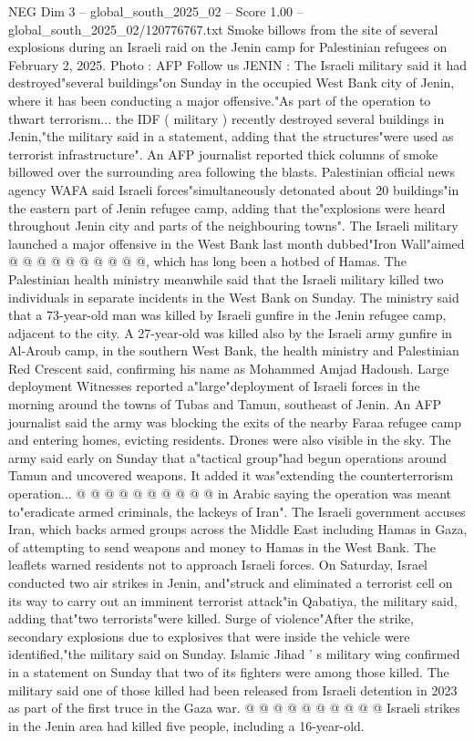 \begin{textsample}{NEG Dim 3 – global\_south\_2025\_02 – Score 1.00 – global\_south\_2025\_02/120776767.txt}  \label{ex:f3_neg_047}
Smoke billows from the site of several explosions during an Israeli raid on the Jenin camp for Palestinian refugees on February 2, 2025.
Photo : AFP Follow us JENIN : The Israeli military said it had destroyed"several buildings"on Sunday in the occupied West Bank city of Jenin, where it has been conducting a major offensive."As part of the operation to thwart terrorism... the IDF ( military ) recently destroyed several buildings in Jenin,"the military said in a statement, adding that the structures"were used as terrorist infrastructure".
An AFP journalist reported thick columns of smoke billowed over the surrounding area following the blasts.
Palestinian official news agency WAFA said Israeli forces"simultaneously detonated about 20 buildings"in the eastern part of Jenin refugee camp, adding that the"explosions were heard throughout Jenin city and parts of the neighbouring towns".
The Israeli military launched a major offensive in the West Bank last month dubbed"Iron Wall"aimed @ @ @ @ @ @ @ @ @ @, which has long been a hotbed of Hamas.
The Palestinian health ministry meanwhile said that the Israeli military killed two individuals in separate incidents in the West Bank on Sunday.
The ministry said that a 73-year-old man was killed by Israeli gunfire in the Jenin refugee camp, adjacent to the city.
A 27-year-old was killed also by the Israeli army gunfire in Al-Aroub camp, in the southern West Bank, the health ministry and Palestinian Red Crescent said, confirming his name as Mohammed Amjad Hadoush.
Large deployment Witnesses reported a"large"deployment of Israeli forces in the morning around the towns of Tubas and Tamun, southeast of Jenin.
An AFP journalist said the army was blocking the exits of the nearby Faraa refugee camp and entering homes, evicting residents.
Drones were also visible in the sky.
The army said early on Sunday that a"tactical group"had begun operations around Tamun and uncovered weapons.
It added it was"extending the counterterrorism operation... @ @ @ @ @ @ @ @ @ @ in Arabic saying the operation was meant to"eradicate armed criminals, the lackeys of Iran".
The Israeli government accuses Iran, which backs armed groups across the Middle East including Hamas in Gaza, of attempting to send weapons and money to Hamas in the West Bank.
The leaflets warned residents not to approach Israeli forces.
On Saturday, Israel conducted two air strikes in Jenin, and"struck and eliminated a terrorist cell on its way to carry out an imminent terrorist attack"in Qabatiya, the military said, adding that"two terrorists"were killed.
Surge of violence"After the strike, secondary explosions due to explosives that were inside the vehicle were identified,"the military said on Sunday.
Islamic Jihad ' s military wing confirmed in a statement on Sunday that two of its fighters were among those killed.
The military said one of those killed had been released from Israeli detention in 2023 as part of the first truce in the Gaza war. @ @ @ @ @ @ @ @ @ @ Israeli strikes in the Jenin area had killed five people, including a 16-year-old.

\end{textsample}
